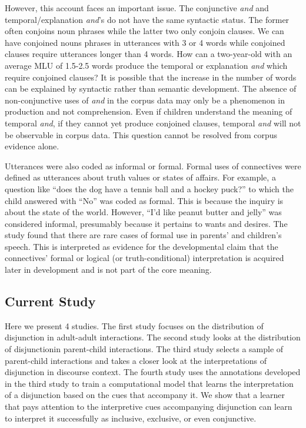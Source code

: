 \documentclass[floatsintext,man]{apa6}
\theoremstyle{definition}
\theoremstyle{definition}
\theoremstyle{definition}
\theoremstyle{remark}
\begin{document}
However, this account faces an important issue. The conjunctive
\emph{and} and temporal/explanation \emph{and}'s do not have the same
syntactic status. The former often conjoins noun phrases while the
latter two only conjoin clauses. We can have conjoined nouns phrases in
utterances with 3 or 4 words while conjoined clauses require utterances
longer than 4 words. How can a two-year-old with an average MLU of
1.5-2.5 words produce the temporal or explanation \emph{and} which
require conjoined clauses? It is possible that the increase in the
number of words can be explained by syntactic rather than semantic
development. The absence of non-conjunctive uses of \emph{and} in the
corpus data may only be a phenomenon in production and not
comprehension. Even if children understand the meaning of temporal
\emph{and}, if they cannot yet produce conjoined clauses, temporal
\emph{and} will not be observable in corpus data. This question cannot
be resolved from corpus evidence alone.

Utterances were also coded as informal or formal. Formal uses of
connectives were defined as utterances about truth values or states of
affairs. For example, a question like \enquote{does the dog have a
tennis ball and a hockey puck?} to which the child answered with
\enquote{No} was coded as formal. This is because the inquiry is about
the state of the world. However, \enquote{I'd like peanut butter and
jelly} was considered informal, presumably because it pertains to wants
and desires. The study found that there are rare cases of formal use in
parents' and children's speech. This is interpreted as evidence for the
developmental claim that the connectives' formal or logical (or
truth-conditional) interpretation is acquired later in development and
is not part of the core meaning.

\subsection{Current Study}\label{current-study}

Here we present 4 studies. The first study focuses on the distribution
of disjunction in adult-adult interactions. The second study looks at
the distribution of disjunctionin parent-child interactions. The third
study selects a sample of parent-child interactions and takes a closer
look at the interpretations of disjunction in discourse context. The
fourth study uses the annotations developed in the third study to train
a computational model that learns the interpretation of a disjunction
based on the cues that accompany it. We show that a learner that pays
attention to the interpretive cues accompanying disjunction can learn to
interpret it successfully as inclusive, exclusive, or even conjunctive.
\end{document}
